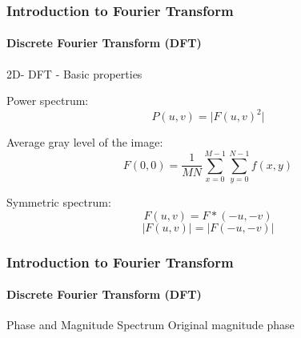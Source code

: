 \documentclass{beamer}
\begin{document}
\begin{frame}
\frametitle{Introduction to Fourier Transform}
\framesubtitle{Discrete Fourier Transform (DFT)}
\begin{block}{2D- DFT - Basic properties}
\begin{itemize}
\scriptsize{
	\item Power spectrum: 
	$$P(u,v) = \vert F(u,v)^2 \vert $$
	\item Average gray level of the image: 
	$$F(0,0) = \frac{1}{MN}\sum^{M-1}_{x=0}\sum^{N-1}_{y=0} f(x,y)$$
	\item Symmetric spectrum: 
	$$F(u,v) = F*(-u,-v) $$
	$$\vert F(u,v) \vert  = \vert F(-u,-v) \vert $$
}
\end{itemize}
\end{block}
\end{frame}
\begin{frame}
\frametitle{Introduction to Fourier Transform}
\framesubtitle{Discrete Fourier Transform (DFT)}
\begin{block}{Phase and Magnitude Spectrum}
\hspace{-0.7cm} Original \hspace{1.8cm} magnitude \hspace{2.5cm} phase
\end{block}
\end{frame}
\end{document}
